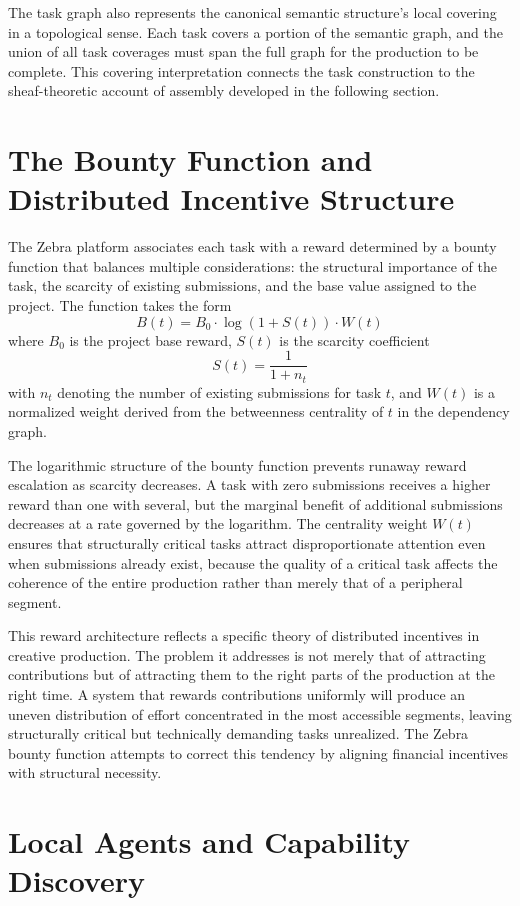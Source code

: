 \documentclass[12pt,a4paper]{article}
\begin{document}
The task graph also represents the canonical semantic structure's local covering in a topological sense. Each task covers a portion of the semantic graph, and the union of all task coverages must span the full graph for the production to be complete. This covering interpretation connects the task construction to the sheaf-theoretic account of assembly developed in the following section.

\section{The Bounty Function and Distributed Incentive Structure}

The Zebra platform associates each task with a reward determined by a bounty function that balances multiple considerations: the structural importance of the task, the scarcity of existing submissions, and the base value assigned to the project. The function takes the form
\[
B(t) = B_0 \cdot \log(1 + S(t)) \cdot W(t)
\]
where $B_0$ is the project base reward, $S(t)$ is the scarcity coefficient
\[
S(t) = \frac{1}{1 + n_t}
\]
with $n_t$ denoting the number of existing submissions for task $t$, and $W(t)$ is a normalized weight derived from the betweenness centrality of $t$ in the dependency graph.

The logarithmic structure of the bounty function prevents runaway reward escalation as scarcity decreases. A task with zero submissions receives a higher reward than one with several, but the marginal benefit of additional submissions decreases at a rate governed by the logarithm. The centrality weight $W(t)$ ensures that structurally critical tasks attract disproportionate attention even when submissions already exist, because the quality of a critical task affects the coherence of the entire production rather than merely that of a peripheral segment.

This reward architecture reflects a specific theory of distributed incentives in creative production. The problem it addresses is not merely that of attracting contributions but of attracting them to the right parts of the production at the right time. A system that rewards contributions uniformly will produce an uneven distribution of effort concentrated in the most accessible segments, leaving structurally critical but technically demanding tasks unrealized. The Zebra bounty function attempts to correct this tendency by aligning financial incentives with structural necessity.

\section{Local Agents and Capability Discovery}
\end{document}
